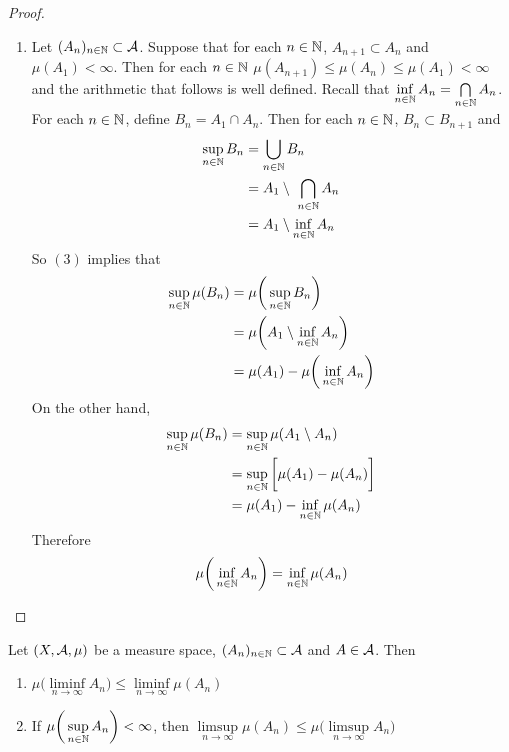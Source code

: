 \documentclass{book}
\begin{document}
\begin{proof}
\begin{enumerate}
\begin{align*}
				&= \sup\limits_{n \in \N} \mu(A_n)
			\end{align*}
			\item Let $(A_n)_{n \in \mathbb{N}} \subset \mathcal{A}$. Suppose that for each $n \in \mathbb{N}$, $ A_{n+1} \subset A_n$ and $\mu(A_1) < \infty$. Then for each $n \in \mathbb{N}$ $\mu(A_{n+1}) \leq \mu(A_n) \leq \mu(A_1) < \infty$ and the arithmetic that follows is well defined. Recall that $\inf\limits_{n \in \mathbb{N}}A_n = \bigcap\limits_{n \in \mathbb{N}}A_n$. For each $n\in \mathbb{N}$, define $B_n = A_1 \cap A_n$. Then for each $n \in \mathbb{N}$, $B_n \subset B_{n+1}$ and
			\begin{align*}
				\sup\limits_{n \in \mathbb{N}}B_n 
				&= \bigcup\limits_{n \in \mathbb{N}}B_n \\
				&= A_1 \setminus \ \bigcap\limits_{n \in \mathbb{N}}A_n \\
				&= A_1 \setminus \inf_{n \in \mathbb{N}}A_n
			\end{align*}  
			So $(3)$ implies that
			\begin{align*}
				\sup\limits_{n \in \mathbb{N}}\mu(B_n) 
				&= \mu \bigg(\sup\limits_{n \in \mathbb{N}}B_n \bigg)\\
				&= \mu \bigg(A_1 \setminus \inf_{n \in \mathbb{N}}A_n \bigg)\\
				&= \mu(A_1) - \mu\bigg(\inf_{n \in \mathbb{N}}A_n \bigg)\\
			\end{align*}
			On the other hand, 
			\begin{align*}
				\sup\limits_{n \in \mathbb{N}}\mu(B_n)
				&= \sup\limits_{n \in \mathbb{N}}\mu(A_1 \setminus A_n)\\
				&= \sup\limits_{n \in \mathbb{N}} \bigg[ \mu(A_1) - \mu(A_n) \bigg]\\
				&= \mu(A_1) - \inf_{n \in \mathbb{N}}\mu(A_n)
			\end{align*}
			Therefore $$\mu\bigg(\inf_{n \in \mathbb{N}}A_n \bigg) = \inf_{n \in \mathbb{N}}\mu(A_n)$$
		\end{enumerate}
	\end{proof}
	
	\begin{ex} 
		Let $(X, \mathcal{A}, \mu)$ be a measure space, $(A_n)_{n \in \mathbb{N}} \subset \mathcal{A}$ and $A \in \mathcal{A}$. Then 
		\begin{enumerate}
			\item $\mu \bigg(\liminf\limits_{n \rightarrow \infty} A_n \bigg) \leq \liminf\limits_{n \rightarrow \infty} \mu(A_n)$
			\item If $\mu\bigg(\sup\limits_{n \in \mathbb{N}}A_n \bigg) < \infty$, then $\limsup\limits_{n \rightarrow \infty}\mu(A_n) \leq \mu \bigg( \limsup\limits_{n \rightarrow \infty}A_n\bigg) $
		\end{enumerate} 
	\end{ex}
	
\end{document}
